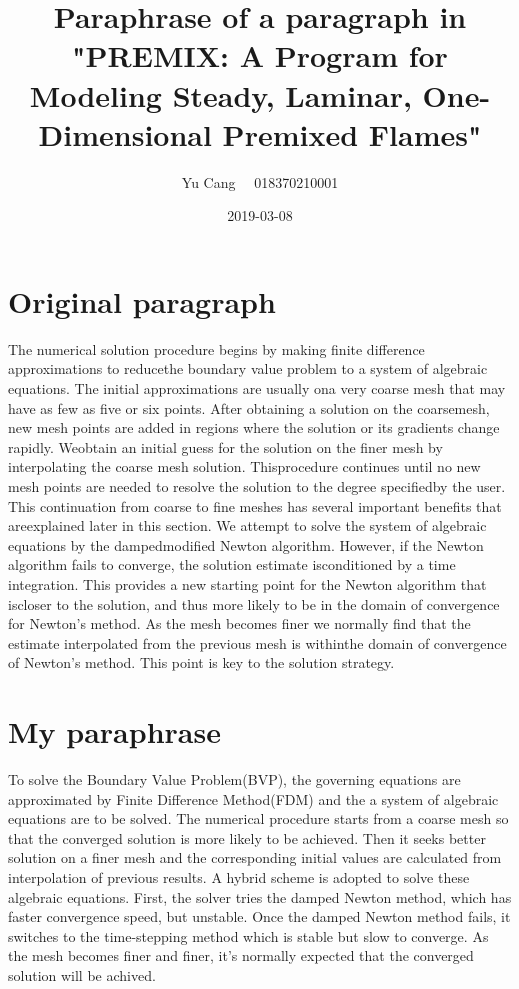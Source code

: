 \documentclass[paper=a4, fontsize=11pt]{scrartcl}
\title{Paraphrase of  a paragraph in "PREMIX: A Program for Modeling Steady, Laminar, One-Dimensional Premixed Flames"}
\author{Yu Cang \ \ 018370210001}
\date{2019-03-08}
\begin{document}
\maketitle

\section{Original paragraph}
	The numerical solution procedure begins by making finite difference approximations to reducethe boundary value problem to a system of algebraic equations. The initial approximations are usually ona very coarse mesh that may have as few as five or six points. After obtaining a solution on the coarsemesh, new mesh points are added in regions where the solution or its gradients change rapidly.  Weobtain an initial guess for the solution on the finer mesh by interpolating the coarse mesh solution. Thisprocedure continues until no new mesh points are needed to resolve the solution to the degree specifiedby the user.  This continuation from coarse to fine meshes has several important benefits that areexplained later in this section.  We attempt to solve the system of algebraic equations by the dampedmodified Newton algorithm. However, if the Newton algorithm fails to converge, the solution estimate isconditioned by a time integration. This provides a new starting point for the Newton algorithm that iscloser to the solution, and thus more likely to be in the domain of convergence for Newton’s method. As the mesh becomes finer we normally find that the estimate interpolated from the previous mesh is withinthe domain of convergence of Newton’s method. This point is key to the solution strategy.


\section{My paraphrase}
	To solve the Boundary Value Problem(BVP), the governing equations are approximated by Finite Difference Method(FDM) and the a system of algebraic equations are to be solved.\newline
	The numerical procedure starts from a coarse mesh so that the converged solution is more likely to be achieved. Then it seeks better solution on a finer mesh and the corresponding initial values are calculated from interpolation of previous results.\newline
	A hybrid scheme is adopted to solve these algebraic equations. First, the solver tries the damped Newton method, which has faster convergence speed, but unstable. Once the damped Newton method fails, it switches to the time-stepping method which is stable but  slow to converge. As the mesh becomes finer and finer, it's normally expected that the converged solution will be achived.
	
\end{document}
